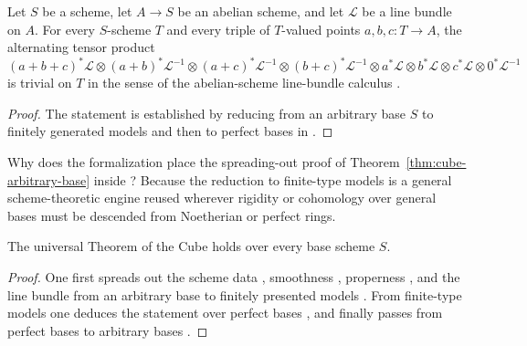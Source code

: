 \begin{theorem}
\label{thm:cube-arbitrary-base}
Let $S$ be a scheme, let $A \to S$ be an abelian scheme, and let $\mathcal{L}$
be a line bundle on $A$. For every $S$-scheme $T$ and every triple of
$T$-valued points $a, b, c : T \to A$, the alternating tensor product
\[
  (a+b+c)^*\mathcal{L} \otimes (a+b)^*\mathcal{L}^{-1}
  \otimes (a+c)^*\mathcal{L}^{-1} \otimes (b+c)^*\mathcal{L}^{-1}
  \otimes a^*\mathcal{L} \otimes b^*\mathcal{L} \otimes c^*\mathcal{L}
  \otimes 0^*\mathcal{L}^{-1}
\]
is trivial on $T$ in the sense of the abelian-scheme line-bundle calculus
.
\end{theorem}

\begin{proof}
The statement is established by reducing from an arbitrary base $S$ to
finitely generated models and then to perfect bases in
.
\end{proof}

Why does the formalization place the spreading-out proof of
Theorem~\ref{thm:cube-arbitrary-base} inside ?
Because the reduction to finite-type models is a general scheme-theoretic
engine reused wherever rigidity or cohomology over general bases must be
descended from Noetherian or perfect rings.

\begin{proposition}
\label{prop:cube-spreading}
The universal Theorem of the Cube 
holds over every base scheme $S$.
\end{proposition}

\begin{proof}
One first spreads out the scheme data ,
smoothness , properness
, and the line bundle
 from an arbitrary base to
finitely presented models .
From finite-type models one deduces the statement over perfect bases
, and finally passes from perfect
bases to arbitrary bases .
\end{proof}

